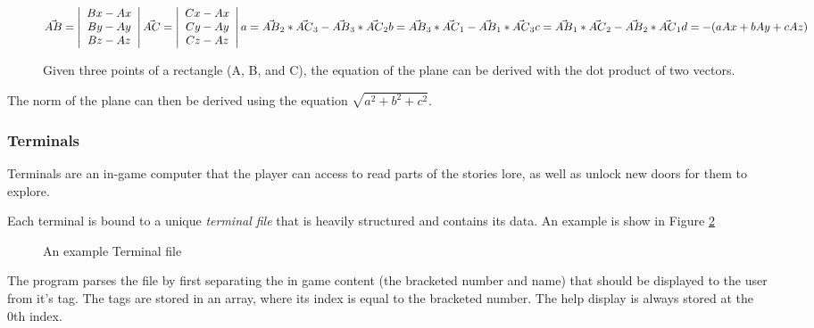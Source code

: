 \documentclass{article}
\begin{document}
\begin{figure}[H]
\noindent
$
\vec{AB} = \left| \begin{array}{c}
Bx - Ax \\
By - Ay \\
Bz - Az
\end{array} \right|
\vec{AC} = \left| \begin{array}{c}
Cx - Ax \\
Cy - Ay \\
Cz - Az
\end{array} \right| \\
a = \vec{AB}_2 * \vec{AC}_3 - \vec{AB}_3 * \vec{AC}_2 \\
b = \vec{AB}_3 * \vec{AC}_1 - \vec{AB}_1 * \vec{AC}_3 \\
c = \vec{AB}_1 * \vec{AC}_2 - \vec{AB}_2 * \vec{AC}_1 \\
d = -(aAx + bAy + cAz)
$

\caption{Given three points of a rectangle (A, B, and C), the equation of the plane can be derived with the dot product of two vectors. \cite{Plane} }
\label{fig:rectangles}
\end{figure}
The norm of the plane can then be derived using the equation $\sqrt{a^2 + b^2 + c^2}$.

\subsubsection{Terminals} \label{subsubsec:terminals}

Terminals are an in-game computer that the player can access to read parts of the stories lore, as well as unlock new doors for them to explore.

Each terminal is bound to a unique \emph{terminal file} that is heavily structured and contains its data. An example is show in Figure \ref{fig:terminal}

\begin{figure}[H]

\caption{An example Terminal file}
\label{fig:terminal}
\end{figure}

The program parses the file by first separating the in game content (the bracketed number and name) that should be displayed to the user from it's tag. The tags are stored in an array, where its index is equal to the bracketed number. The help display is always stored at the 0th index.
\end{document}
